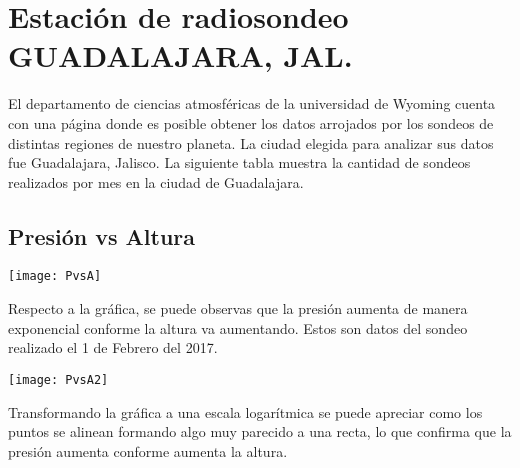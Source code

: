 \documentclass[12pt]{article}
\begin{document}
\newpage
\section{Estación de radiosondeo GUADALAJARA, JAL.}
El departamento de ciencias atmosféricas de la universidad de Wyoming cuenta con una página donde es posible obtener los datos arrojados por los sondeos de distintas regiones de nuestro planeta. La ciudad elegida para analizar sus datos fue Guadalajara, Jalisco. La siguiente tabla muestra la cantidad de sondeos realizados por mes en la ciudad de Guadalajara.

\centering
{}

\newpage
\subsection{Presión vs Altura}
\begin{center}
\texttt{[image: PvsA]}
\end{center}
Respecto a la gráfica, se puede observas que la presión aumenta de manera exponencial conforme la altura va aumentando. Estos son datos del sondeo realizado el 1 de Febrero del 2017.
\begin{center}
\texttt{[image: PvsA2]}
\end{center}
Transformando la gráfica a una escala logarítmica se puede apreciar como los puntos se alinean formando algo muy parecido a una recta, lo que confirma que la presión aumenta conforme aumenta la altura. 
\end{document}
